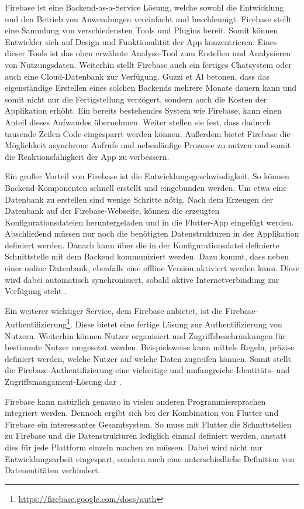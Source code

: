 Firebase ist eine Backend-as-a-Service Lösung, welche sowohl die Entwicklung und den Betrieb von Anwendungen vereinfacht und beschleunigt. Firebase stellt eine Sammlung von verschiedensten Tools und Plugins bereit. Somit können Entwickler sich auf Design und Funktionalität der App konzentrieren. Eines dieser Tools ist das oben erwähnte Analyse-Tool zum Erstellen und Analysieren von Nutzungsdaten. Weiterhin stellt Firebase auch ein fertiges Chatsystem oder auch eine Cloud-Datenbank zur Verfügung. Guzzi et Al \cite{Flutter_Apprentice} betonen, dass das eigenständige Erstellen eines solchen Backends mehrere Monate dauern kann und somit nicht nur die Fertigstellung verzögert, sondern auch die Kosten der Applikation erhöht. Ein bereits bestehendes System wie Firebase, kann einen Anteil dieses Aufwandes übernehmen. Weiter stellen sie fest, dass dadurch tausende Zeilen Code eingesparrt werden können. Außerdem bietet Firebase die Möglichkeit asynchrone Aufrufe und nebenläufige Prozesse zu nutzen und somit die Reaktionsfähigkeit der App zu verbessern.

Ein großer Vorteil von Firebase ist die Entwicklungsgeschwindigkeit. So können Backend-Komponenten schnell erstellt und eingebunden werden. Um  etwa eine Datenbank zu erstellen sind wenige Schritte nötig. Nach dem Erzeugen der Datenbank auf der Firebase-Webseite, können die erzeugten Konfigurationsdateien heruntergeladen und in die Flutter-App eingefügt werden. Abschließend müssen nur noch die benötigten Datenstrukturen in der Applikation definiert werden. Danach kann über die in der Konfigurationsdatei definierte Schnittstelle mit dem Backend kommuniziert werden. Dazu kommt, dass neben einer online Datenbank, ebenfalls eine offline Version aktiviert werden kann. Diese wird dabei automatisch synchronisiert, sobald aktive Internetverbindung zur Verfügung steht \cite{flutter_firebase}.

Ein weiterer wichtiger Service, dem Firebase anbietet, ist die Firebase-Authentifizierung\footnote{\url{https://firebase.google.com/docs/auth}}. Diese bietet eine fertige Lösung zur Authentifizierung von Nutzern. Weiterhin können Nutzer organisiert und Zugriffsbeschränkungen für bestimmte Nutzer umgesetzt werden. Beispielsweise kann mittels Regeln, präzise definiert werden, welche Nutzer auf welche Daten zugreifen können. Somit stellt die Firebase-Authentifizierung eine vielseitige und umfangreiche Identitäts- und Zugriffsmangament-Lösung dar \cite{Flutter_Apprentice}.

Firebase kann natürlich genauso in vielen anderen Programmiersprachen integriert werden. 
Dennoch ergibt sich bei der Kombination von Flutter und Firebase ein interessantes Gesamtsystem.
So muss mit Flutter die Schnittstellen zu Firebase und die Datenstrukturen lediglich einmal definiert werden, anstatt dies für jede Plattform einzeln machen zu müssen.
Dabei wird nicht nur Entwicklungsarbeit eingespart, sondern auch eine unterschiedliche Definition von Datenentitäten verhindert.


